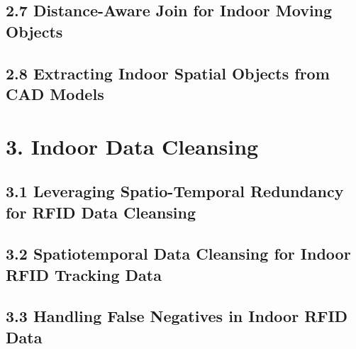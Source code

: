 \documentclass{beamer}
\begin{document}
% 
% 

\subsection{2.7 Distance-Aware Join for Indoor Moving Objects} %

% 
% 

\subsection{2.8 Extracting Indoor Spatial Objects from CAD Models} %

% 
% 

\section{3. Indoor Data Cleansing} %

\subsection{3.1 Leveraging Spatio-Temporal Redundancy for RFID Data Cleansing} %

% 
% 

\subsection{3.2 Spatiotemporal Data Cleansing for Indoor RFID Tracking Data} %

% 
% 

\subsection{3.3 Handling False Negatives in Indoor RFID Data} %
\end{document}
